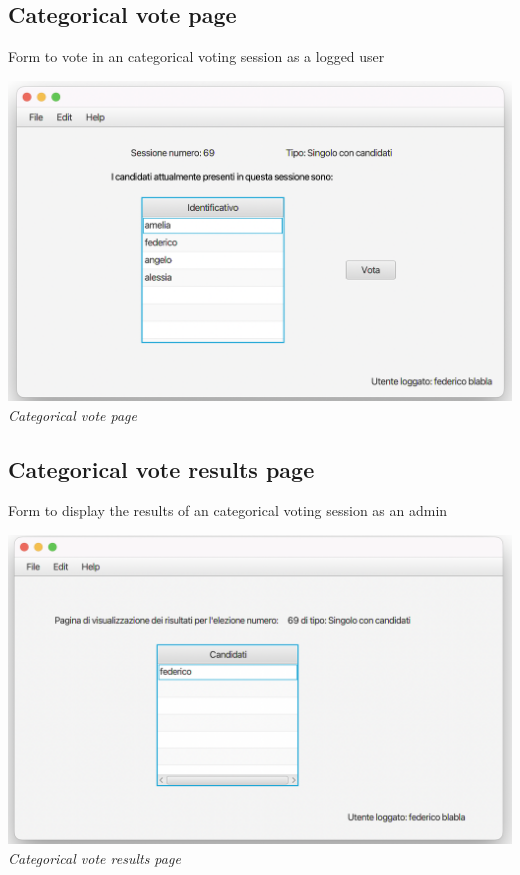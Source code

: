 \documentclass[11pt, oneside]{article}   	%
\begin{document}
\subsection{Categorical vote page}
Form to vote in an categorical voting session as a logged user
    \begin{center}
    \includegraphics[scale=0.45]{images/ui12.png}\\
    \emph{Categorical vote page}
    \end{center}
\subsection{Categorical vote results page}
Form to display the results of an categorical voting session as an admin
\begin{center}
    \includegraphics[scale=0.5]{images/ui13.png}\\
    \emph{Categorical vote results page}
    \end{center}
\end{document}
